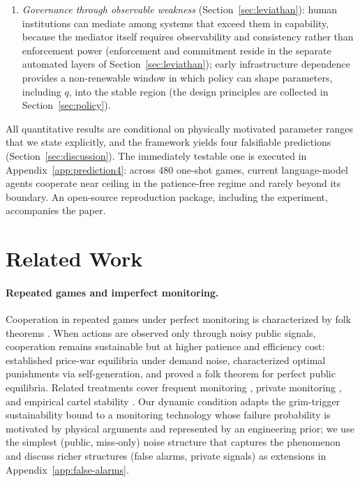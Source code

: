 \documentclass[manuscript,screen,review]{jair}
\begin{document}
\begin{enumerate}
\item \emph{Governance through observable weakness} (Section~\ref{sec:leviathan}): human institutions can mediate among systems that exceed them in capability, because the mediator itself requires observability and consistency rather than enforcement power (enforcement and commitment reside in the separate automated layers of Section~\ref{sec:leviathan}); early infrastructure dependence provides a non-renewable window in which policy can shape parameters, including $q$, into the stable region (the design principles are collected in Section~\ref{sec:policy}).
\end{enumerate}

All quantitative results are conditional on physically motivated parameter ranges that we state explicitly, and the framework yields four falsifiable predictions (Section~\ref{sec:discussion}). The immediately testable one is executed in Appendix~\ref{app:prediction4}: across 480 one-shot games, current language-model agents cooperate near ceiling in the patience-free regime and rarely beyond its boundary. An open-source reproduction package, including the experiment, accompanies the paper.

\section{Related Work}
\label{sec:related}

\paragraph{Repeated games and imperfect monitoring.}
Cooperation in repeated games under perfect monitoring is characterized by folk theorems \cite{friedman.1971,fudenberg.maskin.1986}. When actions are observed only through noisy public signals, cooperation remains sustainable but at higher patience and efficiency cost: \citet{green.porter.1984} established price-war equilibria under demand noise, \citet{abreu.1990} characterized optimal punishments via self-generation, and \citet{fudenberg.1994} proved a folk theorem for perfect public equilibria. Related treatments cover frequent monitoring \cite{abreu.milgrom.pearce.1991}, private monitoring \cite{kandori.obara.2006,ely.horner.olszewski.2005,sugaya.wolitzky.2017}, and empirical cartel stability \cite{levenstein.suslow.2006,fonseca.normann.2012}. Our dynamic condition adapts the grim-trigger sustainability bound to a monitoring technology whose failure probability is motivated by physical arguments and represented by an engineering prior; we use the simplest (public, miss-only) noise structure that captures the phenomenon and discuss richer structures (false alarms, private signals) as extensions in Appendix~\ref{app:false-alarms}.
\end{document}
